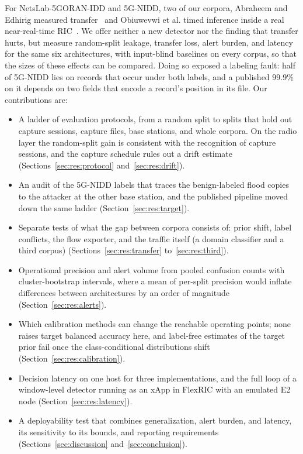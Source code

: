 \documentclass{ieeeaccess}
\begin{document}
For NetsLab-5GORAN-IDD and 5G-NIDD, two of our corpora, Abraheem and Edhirig measured transfer~\cite{abraheem2026bidirectional} and Obiuwevwi et al. timed inference inside a real near-real-time RIC~\cite{obiuwevwi2026realtime}. We offer neither a new detector nor the finding that transfer hurts, but measure random-split leakage, transfer loss, alert burden, and latency for the same six architectures, with input-blind baselines on every corpus, so that the sizes of these effects can be compared. Doing so exposed a labeling fault: half of 5G-NIDD lies on records that occur under both labels, and a published 99.9\% on it depends on two fields that encode a record's position in its file. Our contributions are:

\begin{itemize}
\item A ladder of evaluation protocols, from a random split to splits that hold out capture sessions, capture files, base stations, and whole corpora. On the radio layer the random-split gain is consistent with the recognition of capture sessions, and the capture schedule rules out a drift estimate (Sections~\ref{sec:res:protocol} and~\ref{sec:res:drift}).
\item An audit of the 5G-NIDD labels that traces the benign-labeled flood copies to the attacker at the other base station, and the published pipeline moved down the same ladder (Section~\ref{sec:res:target}).
\item Separate tests of what the gap between corpora consists of: prior shift, label conflicts, the flow exporter, and the traffic itself (a domain classifier and a third corpus) (Sections~\ref{sec:res:transfer} to~\ref{sec:res:third}).
\item Operational precision and alert volume from pooled confusion counts with cluster-bootstrap intervals, where a mean of per-split precision would inflate differences between architectures by an order of magnitude (Section~\ref{sec:res:alerts}).
\item Which calibration methods can change the reachable operating points; none raises target balanced accuracy here, and label-free estimates of the target prior fail once the class-conditional distributions shift (Section~\ref{sec:res:calibration}).
\item Decision latency on one host for three implementations, and the full loop of a window-level detector running as an xApp in FlexRIC with an emulated E2 node (Section~\ref{sec:res:latency}).
\item A deployability test that combines generalization, alert burden, and latency, its sensitivity to its bounds, and reporting requirements (Sections~\ref{sec:discussion} and~\ref{sec:conclusion}).
\end{itemize}
\end{document}
